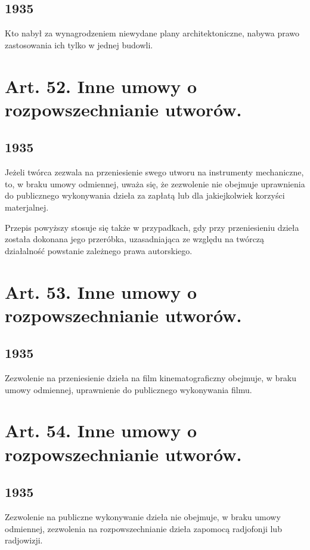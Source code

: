 \documentclass[withmarginpar]{book}
\begin{document}
\subsection{1935}
\label{sec:art.-51-1}

Kto nabył za wynagrodzeniem niewydane plany architektoniczne, nabywa
prawo zastosowania ich tylko w jednej budowli.

\section{Art. 52. Inne umowy o rozpowszechnianie utworów.}
\label{sec:art.-52}
\subsection{1935}
\label{sec:art.-52-1}

Jeżeli twórca zezwala na przeniesienie swego utworu na instrumenty
mechaniczne, to, w braku umowy odmiennej, uważa się, że zezwolenie nie
obejmuje uprawnienia do publicznego wykonywania dzieła za zapłatą lub
dla jakiejkolwiek korzyści materjalnej.

Przepis powyższy stosuje się także w przypadkach, gdy przy
przeniesieniu dzieła została dokonana jego przeróbka, uzasadniająca ze
względu na twórczą działalność powstanie zależnego prawa autorskiego.


\section{Art. 53. Inne umowy o rozpowszechnianie utworów.}
\label{sec:art.-53}
\subsection{1935}
\label{sec:art.-53-1}

Zezwolenie na przeniesienie dzieła na film kinematograficzny obejmuje,
w braku umowy odmiennej, uprawnienie do publicznego wykonywania filmu.

\section{Art. 54. Inne umowy o rozpowszechnianie utworów.}
\label{sec:art.-54}
\subsection{1935}
\label{sec:art.-54-1}

Zezwolenie na publiczne wykonywanie dzieła nie obejmuje, w braku umowy
odmiennej, zezwolenia na rozpowszechnianie dzieła zapomocą radjofonji
lub radjowizji.
\end{document}
